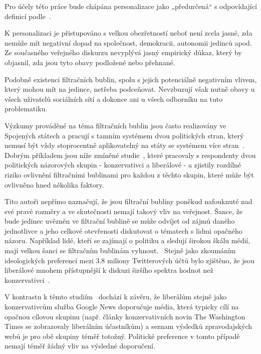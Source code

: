     Pro účely této práce bude chápána personalizace jako „předurčená“ s odpovídající definicí podle~\cite{Pariser2011}.
    
    K personalizaci je přistupováno s velkou obezřetností neboť není zcela jasné, zda nemůže mít negativní dopad na společnost, demokracii, autonomii jedinců apod. Ze současného veřejného diskurzu nevyplývá jasný empirický důkaz, který by objasnil, zda jsou tyto obavy podložené nebo přehnané. 
~\citep{ZuiderveenBorgesius2016Should} 
    
    \setlength\parskip{0mm}
    
    Podobně existenci filtračních bublin, spolu s jejich potenciálně negativním vlivem, který mohou mít na jedince, netřeba podceňovat. Nevzbuzují však nutně obavy u všech uživatelů sociálních sítí a dokonce ani u všech odborníku na tuto problematiku.~\citep{Grossetti} 
    
    Výzkumy prováděné na téma filtračních bublin jsou často realizovány ve Spojených státech a pracují s tamním systémem dvou politických stran, který nemusí být vždy stoprocentně aplikovatelný na státy se systémem více stran~\citep{ZuiderveenBorgesius2016Should}. Dobrým příkladem jsou níže zmíněné studie~\citep{Dubois, Barbera, NECHUSHTAI2019298}, které pracovaly s respondenty dvou politických názorových skupin - konzervativci a liberálové - a zjistily rozdílné riziko ovlivnění filtračními bublinami pro každou z těchto skupin, které může být ovlivněno hned několika faktory.
    
    Tito autoři nepřímo naznačují, že jsou filtrační bubliny poněkud nafouknuté nad své pravé rozměry a ve skutečnosti nemají takový vliv na veřejnost. Šance, že bude jedinec uvězněn ve filtrační bublině se může odvíjet od zájmů daného jednotlivce a jeho celkové otevřenosti diskutovat o tématech s lidmi opačného názoru. Například lidé, kteří se zajímají o politiku a sledují širokou škálu médií, mají velkou šanci se filtračním bublinám vyhnout.~\citep{Dubois} Stejně jako zkoumáním ideologických preferencí mezi 3.8 miliony Twitterových účtů bylo zjištěno, že jsou liberálové mnohem přístupnější k diskuzi širšího spektra hodnot než konzervativci~\citep{Barbera}.
     
    V kontrastu k těmto studiím~\cite{NECHUSHTAI2019298} dochází k závěru, že liberálům stejně jako konzervativcům služba Google News doporučuje média, která typicky cílí na opačnou cílovou skupinu (např. články konzervativních novin The Washington Times se zobrazovaly liberálním účastníkům) a seznam výsledků zpravodajských webů je pro obě skupiny téměř totožný. Politické preference v tomto případě nemají téměř žádný vliv na výsledné doporučení.
    
